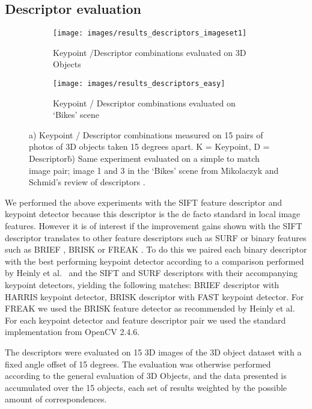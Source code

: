 \documentclass[journal]{IEEEtran}
\begin{document}
\subsection{Descriptor evaluation}
\label{label:desc}

\begin{figure*}[t!]
    \begin{subfigure}[t]{1\textwidth}
        \centering
        \texttt{[image: images/results\_descriptors\_imageset1]}
        \caption{Keypoint /Descriptor combinations evaluated on 3D 
        Objects}
        \label{fig:descriptors}
    \end{subfigure}%

    \begin{subfigure}[t]{1\textwidth}
        \centering
        \texttt{[image: images/results\_descriptors\_easy]}
        \caption{Keypoint / Descriptor combinations evaluated on `Bikes' 
        scene}
        \label{fig:descriptors_easy}
    \end{subfigure}%
    \caption{a) Keypoint / Descriptor combinations measured on 15 pairs 
    of photos of 3D objects taken 15 degrees apart. K = Keypoint, D = 
Descriptor\. b) Same experiment evaluated on a simple to match image 
pair; image 1 and 3 in the `Bikes' scene from Mikolaczyk and Schmid's 
review of descriptors \cite{mikolajczyk2005performance}.}
\end{figure*}

We performed the above experiments with the SIFT feature descriptor and 
keypoint detector because this descriptor is the de facto standard in 
local image features. However it is of interest if the improvement gains
shown with the SIFT descriptor translates to other feature descriptors 
such as SURF \cite{bay2006surf} or binary features such as BRIEF 
\cite{calonder2010brief}, BRISK \cite{leutenegger2011brisk} or FREAK 
\cite{alahi2012freak}. To do this we paired each binary descriptor with 
the best performing keypoint detector according to a comparison 
performed by Heinly et al.\ \cite{heinly2012comparative} and the SIFT 
and SURF descriptors with their accompanying keypoint detectors, 
yielding the following matches: BRIEF descriptor with HARRIS keypoint 
detector, BRISK descriptor with FAST keypoint detector. For FREAK we 
used the BRISK feature detector as recommended by Heinly et al. For each 
keypoint detector and feature descriptor pair we used the standard 
implementation from OpenCV 2.4.6.

The descriptors were evaluated on 15 3D images of the 3D object dataset 
with a fixed angle offset of 15 degrees. The evaluation was otherwise 
performed according to the general evaluation of 3D Objects, and the 
data presented is accumulated over the 15 objects, each set of results 
weighted by the possible amount of correspondences.
\end{document}
